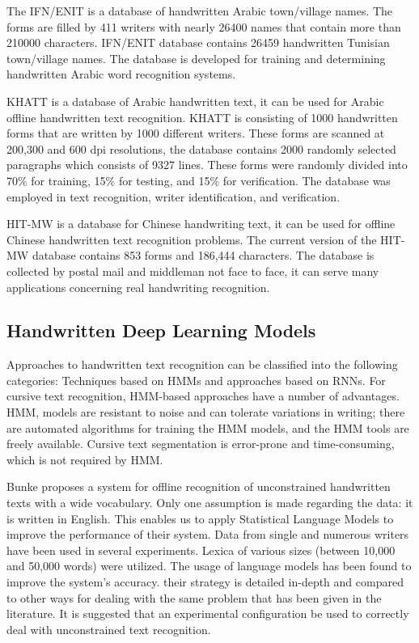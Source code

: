 \documentclass[preprint,12pt]{elsarticle}
\begin{document}
The IFN/ENIT \cite{pechwitz2002ifn} is a database of handwritten Arabic town/village names. The forms are filled by 411 writers with nearly 26400 names that contain more than 210000 characters. IFN/ENIT database contains 26459 handwritten Tunisian town/village names. The database is developed for training and determining handwritten Arabic word recognition systems. 

KHATT \cite{mahmoud2014khatt} is a database of Arabic handwritten text, it can be used for Arabic offline handwritten text recognition. KHATT is consisting of 1000 handwritten forms that are written by 1000 different writers. These forms are scanned at 200,300 and 600 dpi resolutions, the database contains 2000 randomly selected paragraphs which consists of 9327 lines. These forms were randomly divided into 70\% for training, 15\% for testing, and 15\% for verification. The database was employed in text recognition, writer identification, and verification. 




HIT-MW \cite{su2007corpus} is a database for Chinese handwriting text, it can be used for offline Chinese handwritten text recognition problems. The current version of the HIT-MW database contains 853 forms and 186,444 characters. The database is collected by postal mail and middleman not face to face, it can serve many applications concerning real handwriting recognition.

\subsection{Handwritten Deep Learning Models}
Approaches to handwritten text recognition can be classified into the following categories: Techniques based on HMMs and approaches based on RNNs.
For cursive text recognition, HMM-based approaches have a number of advantages. HMM, models are resistant to noise and can tolerate variations in writing; there are automated algorithms for training the HMM models, and the HMM tools are freely available. Cursive text segmentation is error-prone and time-consuming, which is not required by HMM.

Bunke \cite{bunke2004offline} proposes a system for offline recognition of unconstrained handwritten texts with a wide vocabulary. Only one assumption is made regarding the data: it is written in English. This enables us to apply Statistical Language Models to improve the performance of their system. Data from single and numerous writers have been used in several experiments. Lexica of various sizes (between 10,000 and 50,000 words) were utilized. The usage of language models has been found to improve the system's accuracy. their strategy is detailed in-depth and compared to other ways for dealing with the same problem that has been given in the literature. It is suggested that an experimental configuration be used to correctly deal with unconstrained text recognition.
\end{document}
